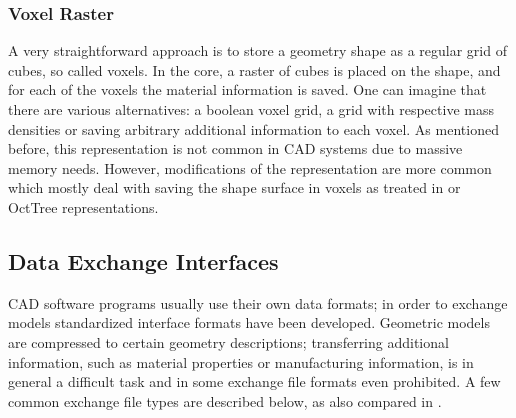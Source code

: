 \subsubsection{Voxel Raster}
A very straightforward approach is to store a geometry shape as a regular grid of cubes, so called voxels. In the core, a raster of cubes is placed on the shape, and for each of the voxels the material information is saved. One can imagine that there are various alternatives: a boolean voxel grid, a grid with respective mass densities or saving arbitrary additional information to each voxel. As mentioned before, this representation is not common in CAD systems due to massive memory needs. However, modifications of the representation are more common which mostly deal with saving the shape surface in voxels as treated in \cite{CohenOr1995} or OctTree representations.  

\subsection{Data Exchange Interfaces}
\ac{CAD} software programs usually use their own data formats; in order to exchange models standardized interface formats have been developed. Geometric models are compressed to certain geometry descriptions; transferring additional information, such as material properties or manufacturing information, is in general a difficult task and in some exchange file formats even prohibited. A few common exchange file types are described below, as also compared in \cite{STL}.
